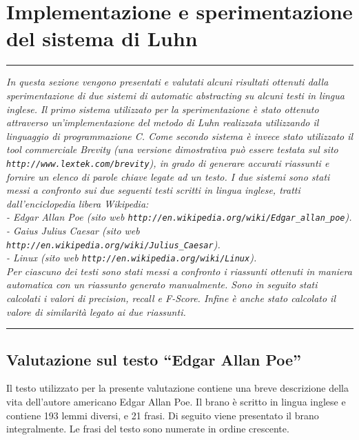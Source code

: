 \chapter{Implementazione e sperimentazione del sistema di Luhn}
\vspace{2cm}
\begin{small}
\hrule
\vspace{0.2cm}
\textit{
In questa sezione vengono presentati e valutati alcuni risultati ottenuti dalla sperimentazione di due sistemi di automatic abstracting
su alcuni testi in lingua inglese.
Il primo sistema utilizzato per la sperimentazione \`{e} stato ottenuto attraverso un'implementazione del metodo di Luhn realizzata utilizzando il linguaggio di programmazione C. 
Come secondo sistema \`{e} invece stato utilizzato il tool commerciale Brevity (una versione dimostrativa pu\`{o} essere testata sul sito \texttt{http://www.lextek.com/brevity}), in grado di generare accurati riassunti 
e fornire un elenco di parole chiave legate ad un testo.
I due sistemi sono stati messi a confronto sui due seguenti testi scritti in lingua inglese, tratti dall'enciclopedia libera Wikipedia:\\
- Edgar Allan Poe (sito web \texttt{http://en.wikipedia.org/wiki/Edgar\_allan\_poe}).\\
- Gaius Julius Caesar (sito web \texttt{http://en.wikipedia.org/wiki/Julius\_Caesar}).\\
- Linux (sito web \texttt{http://en.wikipedia.org/wiki/Linux}).\\
Per ciascuno dei testi sono stati messi a confronto i riassunti ottenuti in maniera automatica con un riassunto generato manualmente.
Sono in seguito stati calcolati i valori di precision, recall e F-Score. Infine \`{e} anche stato calcolato il valore di similarit\`{a} legato ai due riassunti.
}\\[0.2cm]
\hrule
\vspace{0.2cm}
\end{small}
\vfill
\newpage


\section{Valutazione sul testo ``Edgar Allan Poe''}
Il testo utilizzato per la presente valutazione contiene una breve descrizione della vita dell'autore americano Edgar Allan Poe.
Il brano \`{e} scritto in lingua inglese e contiene 193 lemmi diversi, e 21 frasi.
Di seguito viene presentato il brano integralmente. Le frasi del testo sono numerate in ordine crescente.\\[0.2cm]


